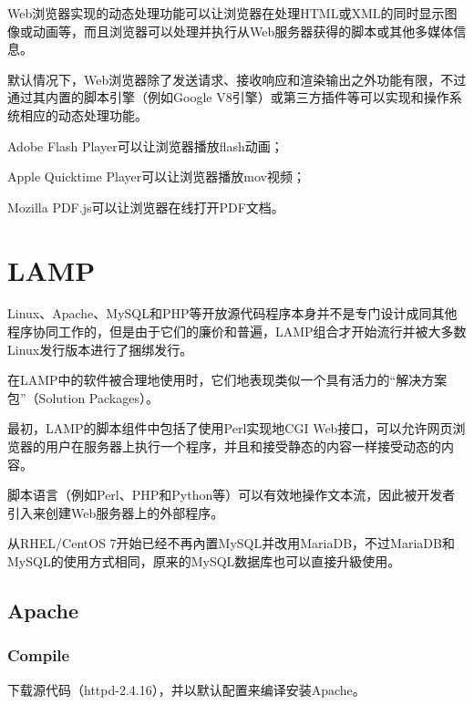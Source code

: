 Web浏览器实现的动态处理功能可以让浏览器在处理HTML或XML的同时显示图像或动画等，而且浏览器可以处理并执行从Web服务器获得的脚本或其他多媒体信息。

默认情况下，Web浏览器除了发送请求、接收响应和渲染输出之外功能有限，不过通过其内置的脚本引擎（例如Google V8引擎）或第三方插件等可以实现和操作系统相应的动态处理功能。



\begin{compactitem}
\item Adobe Flash Player可以让浏览器播放flash动画；
\item Apple Quicktime Player可以让浏览器播放mov视频；
\item Mozilla PDF.js可以让浏览器在线打开PDF文档。
\end{compactitem}


\chapter{LAMP}


Linux、Apache、MySQL和PHP等开放源代码程序本身并不是专门设计成同其他程序协同工作的，但是由于它们的廉价和普遍，LAMP组合才开始流行并被大多数Linux发行版本进行了捆绑发行。


在LAMP中的软件被合理地使用时，它们地表现类似一个具有活力的“解决方案包”（Solution Packages）。

最初，LAMP的脚本组件中包括了使用Perl实现地CGI Web接口，可以允许网页浏览器的用户在服务器上执行一个程序，并且和接受静态的内容一样接受动态的内容。

脚本语言（例如Perl、PHP和Python等）可以有效地操作文本流，因此被开发者引入来创建Web服务器上的外部程序。

从RHEL/CentOS 7开始已经不再內置MySQL并改用MariaDB，不过MariaDB和MySQL的使用方式相同，原来的MySQL数据库也可以直接升級使用。


\section{Apache}

\subsection{Compile}

下载源代码（httpd-2.4.16），并以默认配置来编译安装Apache。

